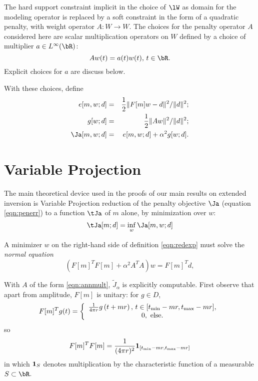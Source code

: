 The hard
support constraint implicit in the choice of $\lW$ as domain for the
modeling operator is replaced by a soft constraint in the form of a
quadratic penalty, with weight operator $A:W \rightarrow W$.
The choices for the penalty operator $A$ considered here are scalar 
multiplication operators on $W$ defined by a choice of multiplier $a \in L^{\infty}(\bR)$:
\begin{equation}
  \label{eqn:annmult}
  A w(t)= a(t)w(t), \, t\in \bR.
\end{equation}
Explicit choices
for $a$ are discuss below.

With these choices, define
\begin{eqnarray}
  \label{eqn:edef}
  e[m,w;d] & = & \frac{1}{2}\|F[m]w-d\|^2/\|d\|^2;\\
  \label{eqn:gdef}
  g[w;d] & = & \frac{1}{2}\|Aw\|^2/\|d\|^2;\\
  \label{eqn:jdef}
  \Ja[m,w;d] & = & e[m,w;d] + \alpha^2g[w;d].
\end{eqnarray}

\section{Variable Projection}
The main theoretical device used in the proofs of our main results on 
extended inversion is Variable Projection reduction of the penalty objective $\Ja$
(equation \ref{eqn:penerr}) to a function $\tJa$ of 
$m$ alone, by minimization over $w$:
\begin{equation}
  \label{eqn:redexp}
  \tJa[m;d] = \inf_w \Ja[m,w;d]
\end{equation}

A minimizer $w$ on the right-hand side of definition
\ref{eqn:redexp} must solve the {\em normal equation}
\begin{equation}
  \label{eqn:norm}
  (F[m]^TF[m]+\alpha^2A^TA)w= F[m]^Td, 
\end{equation}


With $A$ of the form \ref{eqn:annmult}, $\tilde{J}_{\alpha}$ is explicitly
computable. First observe that apart from amplitude, $F[m]$ is
unitary: for $g \in D$,
\begin{equation}
\label{eqn:tran}
F[m]^T g (t) =
\left\{
  \begin{array}{c}
    \frac{1}{4\pi r}g\left(t+mr\right), \, t \in [t_{\rm min}-mr,
    t_{\rm max}-mr],\\
    0, \mbox{ else.}
  \end{array}
\right.
\end{equation}
so
\begin{equation}
  \label{eqn:unit}
  F[m]^TF[m] = \frac{1}{(4\pi r)^2}{\bf 1}_{[t_{\rm min}-mr,  
    t_{\rm max}-mr]}
\end{equation}
in which ${\bf 1}_{S}$ denotes
multiplication by the characteristic function of a measurable 
$S \subset \bR$.

